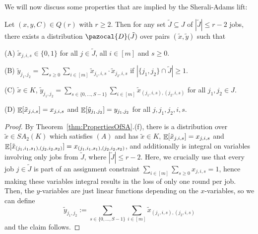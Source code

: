We will now discuss some properties that are implied by the Sherali-Adams lift: %
\begin{lemma} \label{lem:PropertiesOfSAforSchedulingWithCommDelaysLP}
  Let $(x,y,C) \in Q(r)$ with $r \geq 2$. Then for any set $\tilde{J} \subseteq J$ of $|\tilde{J}| \leq r-2$ jobs,
  there exists a distribution $\pazocal{D}(\tilde{J})$ over pairs $(\tilde{x},\tilde{y})$ such that
  \begin{enumerate*}
  \item[(A)] $\tilde{x}_{j,i,s} \in \{ 0,1\}$ for all $j \in \tilde{J}$, all $i \in [m]$ and $s \geq 0$.
  \item[(B)]  $\tilde{y}_{j_1,j_2} = \sum_{s \geq 0} \sum_{i \in [m]} \tilde{x}_{j_1,i,s} \cdot \tilde{x}_{j_2,i,s}$ if $|\{j_1,j_2\} \cap \tilde{J}| \geq 1$.
  \item[(C)] $\tilde{x} \in K$, $\tilde{y}_{j_1,j_2} = \sum_{s \in \{ 0,\ldots,S-1\}} \sum_{i \in [m]} \tilde{x}_{(j_1,i,s),(j_2,i,s)}$
    for all $j_1,j_2 \in J$.
   \item[(D)] $\mathop{\mathbb{E}}[\tilde{x}_{j,i,s}] = x_{j,i,s}$ and $\mathop{\mathbb{E}}[\tilde{y}_{j_1,j_2}] = y_{j_1,j_2}$ for all $j,j_1,j_2,i,s$.
  \end{enumerate*}
\end{lemma}
\begin{proof}
By Theorem~\ref{thm:PropertiesOfSA}.(f), there is a distribution over $\tilde{x} \in SA_{2}(K)$
which satisfies $(A)$ and has $\tilde{x} \in K$, $\mathop{\mathbb{E}}[\tilde{x}_{j,i,s}] = x_{j,i,s}$ and 
$\mathop{\mathbb{E}}[\tilde{x}_{(j_1,i_1,s_1),(j_2,i_2,s_2)}] = x_{(j_1,i_1,s_1),(j_2,i_2,s_2)}$,
and additionally is integral on variables involving only jobs from $\tilde{J}$, where $|\tilde{J}| \leq r-2$.
Here, we crucially use that every job $j \in \tilde{J}$ is part of an assignment constraint $\sum_{i \in [m]} \sum_{s \geq 0} x_{j,i,s} = 1$,
hence making these variables integral results in the loss of only one round per job.
Then, the $y$-variables are just linear functions depending on the $x$-variables, so we can define
  \[
\tilde{y}_{j_1,j_2} := \sum_{s \in \{ 0,\ldots,S-1\}} \sum_{i \in [m]} \tilde{x}_{(j_1,i,s),(j_2,i,s)} 
  \]
  and the claim follows. 
\end{proof}



